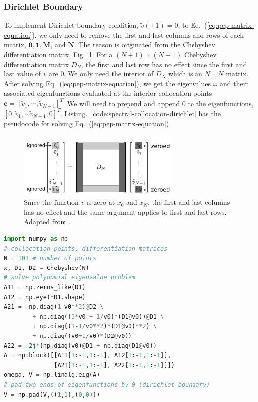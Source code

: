 \subsubsection*{Dirichlet Boundary}
To implement Dirichlet boundary condition, $\tilde{v}(\pm 1)=0$, to Eq.~(\ref{eq:pep-matrix-equation}), we only need to remove the first and last columns and rows of each matrix, $\mathbf{0,1,M}$, and $\mathbf{N}$. The reason is originated from the Chebyshev differentiation matrix, Fig.~\ref{fig:chebyshev-differentiation-dirichlet}. For a $(N+1)\times(N+1)$ Chebyshev differentiation matrix $D_N$, the first and last row has no effect since the first and last value of $\tilde{v}$ are $0$. We only need the interior of $D_N$ which is an $N\times N$ matrix. After solving Eq.~(\ref{eq:pep-matrix-equation}), we get the eigenvalues $\omega$ and their associated eigenfunctions evaluated at the interior collocation points $\mathbf{c} = [\tilde{v}_1,\cdots,\tilde{v}_{N-1}]^T$. We will need to prepend and append 0 to the eigenfunctions, $[0, \tilde{v}_1,\cdots\tilde{v}_{N-1}, 0]^T$. Listing.~\ref{code:spectral-collocation-dirichlet} has the pseudocode for solving Eq.~(\ref{eq:pep-matrix-equation}).

\begin{figure} [htpb]
	\centering
	\includegraphics[width=0.7\textwidth]{figures/chebyshev-differentiation-dirichlet.png}
	\caption{Since the function $v$ is zero at $x_0$ and  $x_N$, the first and last columns has no effect and the same argument applies to first and last rows. Adapted from \cite{trefethen_spectral_2000}.}
	\label{fig:chebyshev-differentiation-dirichlet}
\end{figure}


\begin{lstlisting}[language=Python, float, floatplacement=H, caption={Pseudocode for solving polynomial eigenvalue problem using spectral collocation with Dirichlet boundary condition.}, label=code:spectral-collocation-dirichlet]
import numpy as np
# collocation points, differentiation matrices	
N = 101 # number of points
x, D1, D2 = Chebyshev(N) 
# solve polynomial eigenvalue problem
A11 = np.zeros_like(D1)
A12 = np.eye(*D1.shape)
A21 = -np.diag(1-v0**2)@D2 \
        + np.diag((3*v0 + 1/v0)*(D1@v0))@D1 \
        + np.diag((1-1/v0**2)*(D1@v0)**2) \
        + np.diag((v0+1/v0)*(D2@v0)) 
A22 = -2j*(np.diag(v0)@D1 + np.diag(D1@v0))
A = np.block([[A11[1:-1,1:-1], A12[1:-1,1:-1]],
              [A21[1:-1,1:-1], A22[1:-1,1:-1]]])
omega, V = np.linalg.eig(A)
# pad two ends of eigenfunctions by 0 (dirichlet boundary)
V = np.pad(V,((1,1),(0,0)))
\end{lstlisting}

